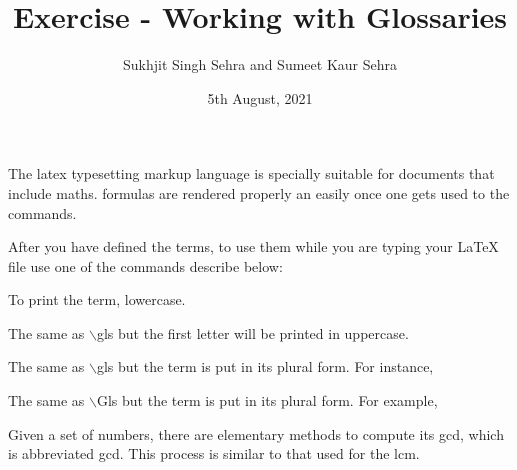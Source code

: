 \documentclass[11pt,a4paper]{article}
\title{Exercise - Working with Glossaries}
\author{Sukhjit Singh Sehra and Sumeet Kaur Sehra}
\date{5th August, 2021}
\begin{document}
%
\maketitle
\tableofcontents
%
The \Gls{latex} typesetting markup language is specially suitable 
for documents that include \gls{maths}. \Glspl{formula} are 
rendered properly an easily once one gets used to the commands.

\begin{description}
	\item After you have defined the terms, to use them while you are typing your LaTeX file use one of the commands describe below:
	
	\item[$\backslash$gls{ }]
	To print the term, lowercase. 
	\item[$\backslash$Gls{ }]
	The same as $\backslash$gls but the first letter will be printed in uppercase.
	
	\item[$\backslash$glspl{ }]
	The same as $\backslash$gls but the term is put in its plural form. For instance, 
	
	\item[$\backslash$Glspl{ }]
	The same as $\backslash$Gls but the term is put in its plural form. For example, 
\end{description}
 
Given a set of numbers, there are elementary methods to compute 
its \acrlong{gcd}, which is abbreviated \acrshort{gcd}. This 
process is similar to that used for the \acrfull{lcm}.
%
\printglossary[title=Abbrevations, toctitle=List of terms,type=\acronymtype]
\printglossary
\printglossary[title=Special Terms, toctitle=List of terms]
\end{document}
